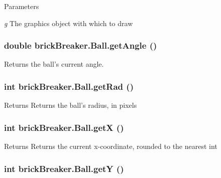 \begin{DoxyParams}{Parameters}
\item[{\em g}]The graphics object with which to draw \end{DoxyParams}
\hypertarget{classbrick_breaker_1_1_ball_a022f1feac935da4a1480fc70f56858d4}{
\subsubsection[{getAngle}]{\setlength{\rightskip}{0pt plus 5cm}double brickBreaker.Ball.getAngle ()}}
\label{classbrick_breaker_1_1_ball_a022f1feac935da4a1480fc70f56858d4}
Returns the ball's current angle. \hypertarget{classbrick_breaker_1_1_ball_ae4ca4fc89a298a422b96c3056e9b9d1a}{
\subsubsection[{getRad}]{\setlength{\rightskip}{0pt plus 5cm}int brickBreaker.Ball.getRad ()}}
\label{classbrick_breaker_1_1_ball_ae4ca4fc89a298a422b96c3056e9b9d1a}
\begin{DoxyReturn}{Returns}
Returns the ball's radius, in pixels 
\end{DoxyReturn}
\hypertarget{classbrick_breaker_1_1_ball_af0651b3d0294b6843a7a5b74acb87195}{
\subsubsection[{getX}]{\setlength{\rightskip}{0pt plus 5cm}int brickBreaker.Ball.getX ()}}
\label{classbrick_breaker_1_1_ball_af0651b3d0294b6843a7a5b74acb87195}
\begin{DoxyReturn}{Returns}
Returns the current x-\/coordinate, rounded to the nearest int 
\end{DoxyReturn}
\hypertarget{classbrick_breaker_1_1_ball_abc92d446c039bfae85f89ba82facdfc3}{
\subsubsection[{getY}]{\setlength{\rightskip}{0pt plus 5cm}int brickBreaker.Ball.getY ()}}
